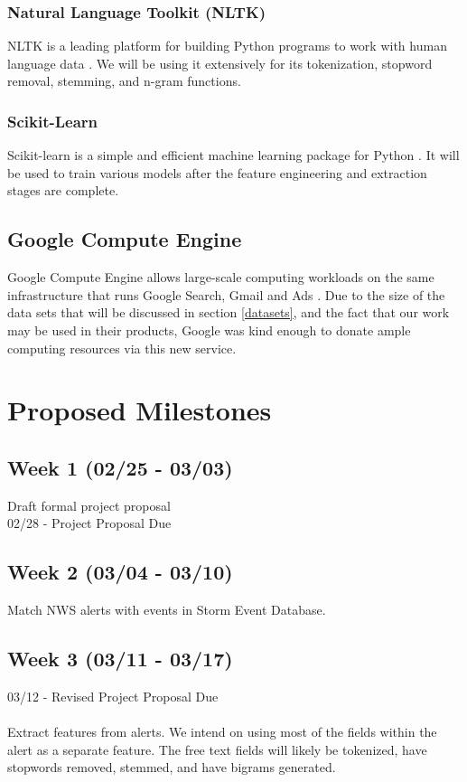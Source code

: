 \documentclass{article}
\begin{document}
\subsubsection{Natural Language Toolkit (NLTK)}
NLTK is a leading platform for building Python programs to work with human language data \cite{nltk}. We will be using it extensively for its tokenization, stopword removal, stemming, and n-gram functions.

\subsubsection{Scikit-Learn}
Scikit-learn is a simple and efficient machine learning package for Python \cite{scikit-learn}. It will be used to train various models after the feature engineering and extraction stages are complete.

\subsection{Google Compute Engine}
Google Compute Engine allows large-scale computing workloads on the same infrastructure that runs Google Search, Gmail and Ads \cite{compute-engine}. Due to the size of the data sets that will be discussed in section \ref{datasets}, and the fact that our work may be used in their products, Google was kind enough to donate ample computing resources via this new service.

\section{Proposed Milestones}
\label{milestones}

\subsection*{Week 1 (02/25 - 03/03)}
Draft formal project proposal\\
02/28 - Project Proposal Due

\subsection*{Week 2 (03/04 - 03/10)}
Match NWS alerts with events in Storm Event Database.

\subsection*{Week 3 (03/11 - 03/17)}
03/12 - Revised Project Proposal Due\\
\\
Extract features from alerts. We intend on using most of the fields within the alert as a separate feature. The free text fields will likely be tokenized, have stopwords removed, stemmed, and have bigrams generated. 
\end{document}
